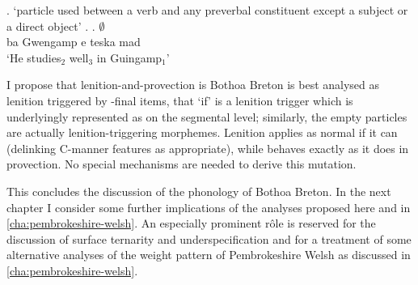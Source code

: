 \ex.\ipa{[$\emptyset$]} `particle used between a verb and any preverbal constituent except a subject or a direct object'
\a.
\bg.\ipa{[ba}  $\emptyset$  \ipa{ˈmaːd̥$_3$]}\\
ba Gwengamp e teska mad\\
`He studies$_2$ well$_3$ in Guingamp$_1$'

I propose that lenition\hyp and\hyp provection is Bothoa Breton is best analysed as lenition triggered by \ipa{[h]}-final items, \ie that `if' is a lenition trigger which is underlyingly represented as  on the segmental level; similarly, the empty particles are actually lenition-triggering  morphemes. Lenition applies as normal if it can (\ie delinking C-manner features as appropriate), while \ipa{[h]} behaves exactly as it does in provection. No special mechanisms are needed to derive this mutation.

This concludes the discussion of the phonology of Bothoa Breton. In the next chapter I consider some further implications of the analyses proposed here and in \cref{cha:pembrokeshire-welsh}. An especially prominent rôle is reserved for the discussion of surface ternarity and underspecification and for a treatment of some alternative analyses of the weight pattern of Pembrokeshire Welsh as discussed in \cref{cha:pembrokeshire-welsh}.